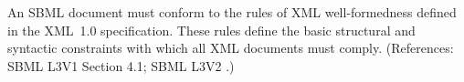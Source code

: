 An SBML document must conform to the rules of XML well-formedness defined
in the XML~1.0 specification.  These rules define the basic structural and
syntactic constraints with which all XML documents must comply.
(References: SBML L3V1 Section 4.1; SBML L3V2 .)
